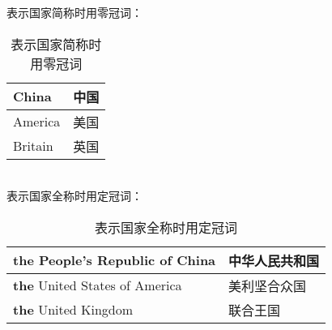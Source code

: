 \documentclass[UTF8]{ctexart}
\begin{document}
    表示国家简称时用零冠词：
    \begin{table}[h!]
        \begin{center}
            \ttfamily
            \begin{tabular}{p{180pt}|p{100pt}}
                \hline
                China&中国\\ \hline
                America&美国\\ \hline
                Britain&英国\\ \hline
            \end{tabular}
            \rmfamily
            \caption{表示国家简称时用零冠词}
        \end{center}
    \end{table}\\
    表示国家全称时用定冠词：
    \begin{table}[h!]
        \begin{center}
            \ttfamily
            \begin{tabular}{p{180pt}|p{100pt}}
                \hline
                \textbf{the} People's Republic of China&中华人民共和国\\ \hline
                \textbf{the} United States of America&美利坚合众国\\ \hline
                \textbf{the} United Kingdom&联合王国\\ \hline
            \end{tabular}
            \rmfamily
            \caption{表示国家全称时用定冠词}
        \end{center}
    \end{table}

\newpage
\end{document}
